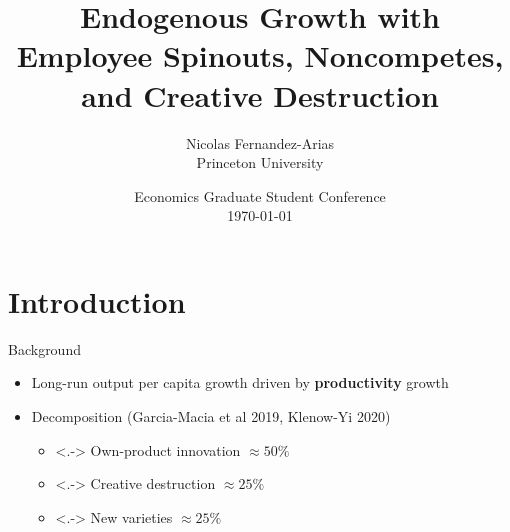 \documentclass[english,usenames,dvipsnames]{beamer}
\title{Endogenous Growth with Employee Spinouts, Noncompetes, and Creative Destruction}
\author{Nicolas Fernandez-Arias \\ Princeton University}
\date{Economics Graduate Student Conference \\ \today }
\begin{document}
\maketitle

\section{Introduction}


\begin{frame}{Background}\label{motivation_background}
	\begin{itemize}
		\item<+-> Long-run output per capita growth driven by \alert{\textbf{productivity}} growth \hyperlink{economic_growth_facts}{}
		\medskip
		\item<+-> Decomposition (Garcia-Macia et al 2019, Klenow-Yi 2020)
		\begin{itemize}
			\item<.-> Own-product innovation $\approx 50\%$
			\item<.-> Creative destruction $\approx 25\%$
			\item<.-> New varieties $\approx 25\%$
		\end{itemize}
	\end{itemize}
\end{frame}
\end{document}
